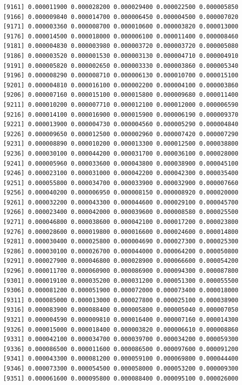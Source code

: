 \documentclass[]{article}
\begin{document}
\begin{verbatim}
 [9161] 0.000011900 0.000028200 0.000029400 0.000022500 0.000005850
 [9166] 0.000009840 0.000014700 0.000006450 0.000004500 0.000007020
 [9171] 0.000003360 0.000008700 0.000010600 0.000003820 0.000013000
 [9176] 0.000014500 0.000018000 0.000006100 0.000011400 0.000008460
 [9181] 0.000004830 0.000003980 0.000003720 0.000003720 0.000005080
 [9186] 0.000003520 0.000001530 0.000003130 0.000004710 0.000004910
 [9191] 0.000005820 0.000002650 0.000003330 0.000003860 0.000005340
 [9196] 0.000008290 0.000008710 0.000006130 0.000010700 0.000015100
 [9201] 0.000004810 0.000016100 0.000002200 0.000004100 0.000003860
 [9206] 0.000007160 0.000015100 0.000015800 0.000009680 0.000011400
 [9211] 0.000010200 0.000007710 0.000012100 0.000012000 0.000006590
 [9216] 0.000014100 0.000016900 0.000015900 0.000006190 0.000009370
 [9221] 0.000013900 0.000004730 0.000004560 0.000005290 0.000004840
 [9226] 0.000009650 0.000012500 0.000002960 0.000007420 0.000007290
 [9231] 0.000008890 0.000010200 0.000013300 0.000012500 0.000038800
 [9236] 0.000030100 0.000044200 0.000031700 0.000036100 0.000028000
 [9241] 0.000005960 0.000033600 0.000043800 0.000038900 0.000045100
 [9246] 0.000023100 0.000031000 0.000042200 0.000042300 0.000035400
 [9251] 0.000055800 0.000034700 0.000033900 0.000032900 0.000007660
 [9256] 0.000040200 0.000006950 0.000008150 0.000008920 0.000020000
 [9261] 0.000032200 0.000043300 0.000044600 0.000029100 0.000045700
 [9266] 0.000023400 0.000042000 0.000039600 0.000008580 0.000025500
 [9271] 0.000046800 0.000038600 0.000042100 0.000017200 0.000023800
 [9276] 0.000028600 0.000019800 0.000016600 0.000024600 0.000014800
 [9281] 0.000030400 0.000025800 0.000004690 0.000027300 0.000025300
 [9286] 0.000030100 0.000026700 0.000044000 0.000064200 0.000050800
 [9291] 0.000027900 0.000046800 0.000028900 0.000066600 0.000054200
 [9296] 0.000011700 0.000060900 0.000086900 0.000094300 0.000087800
 [9301] 0.000019100 0.000035200 0.000031200 0.000051300 0.000055500
 [9306] 0.000081200 0.000051900 0.000072000 0.000073400 0.000018000
 [9311] 0.000085000 0.000013000 0.000027800 0.000025100 0.000038900
 [9316] 0.000083900 0.000088400 0.000005800 0.000005040 0.000007050
 [9321] 0.000004590 0.000009810 0.000016400 0.000007160 0.000014300
 [9326] 0.000015000 0.000018400 0.000003820 0.000006610 0.000008860
 [9331] 0.000042100 0.000034700 0.000039700 0.000034200 0.000059300
 [9336] 0.000086500 0.000011600 0.000086500 0.000097600 0.000091200
 [9341] 0.000043300 0.000081200 0.000059100 0.000069800 0.000044400
 [9346] 0.000073300 0.000054500 0.000058000 0.000053200 0.000009300
 [9351] 0.000061600 0.000095800 0.000088400 0.000095100 0.000026000

\end{verbatim}
\end{document}
